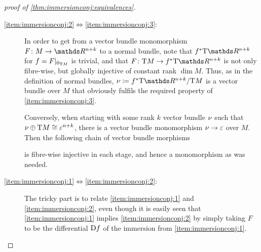 \begin{proof}[proof of \autoref{thm:immersionconj:equivalences}]
  \begin{description}
  \item[\ref{item:immersionconj:2}$\Leftrightarrow$\ref{item:immersionconj:3}:]
    In order to get from a vector bundle monomorphism
    $F\colon M\to\R^{n+k}$ to a normal bundle, note that
    $\pb f\T{\R^{n+k}}$ for $f=F|_{0_{\mathrm{T}M}}$ is 
    trivial, and that $F\colon \T M\to \pb f\T{\R^{n+k}}$ is not only
    fibre-wise, but globally injective of constant rank
    $\dim M$.
    Thus, as in the definition of normal bundles,
    $\N{}\coloneqq\pb f\T{\R^{n+k}}/\T M$ is a vector bundle over $M$
    that obviously fulfils the required property of
    \ref{item:immersionconj:3}.
    
    Conversely, when starting with some rank $k$ vector bundle $\nu_{}$
    such that $\nu_{}\oplus\mathrm{T}M\cong\varepsilon^{n+k}$, there is a vector
    bundle monomorphism $\nu_{}\to\varepsilon$ over $M$. Then the
    following chain of vector bundle morphisms
    \begin{center}
    \end{center}
    is fibre-wise injective in each stage, and hence a monomorphism as
    was needed.
  \item[\ref{item:immersionconj:1}$\Leftrightarrow$\ref{item:immersionconj:2}:]
    The tricky part is to relate \ref{item:immersionconj:1} and
    \ref{item:immersionconj:2}, even though it is easily seen that
    \ref{item:immersionconj:1} implies \ref{item:immersionconj:2} by
    simply taking $F$ to be the differential $\mathrm{D} f$ of the
    immersion from \ref{item:immersionconj:1}.
    

\end{description}
\end{proof}

